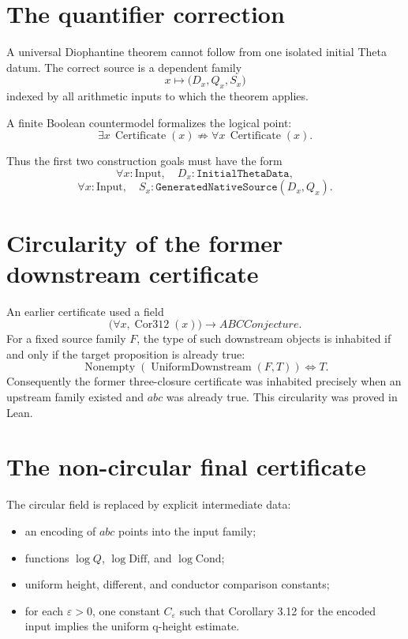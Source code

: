 \documentclass[11pt]{amsart}
\theoremstyle{definition}
\theoremstyle{remark}
\newcommand{\eps}{\varepsilon}
\begin{document}
\section{The quantifier correction}

A universal Diophantine theorem cannot follow from one isolated initial
Theta datum.  The correct source is a dependent family
\[
 x\longmapsto
 \bigl(D_x,Q_x,S_x\bigr)
\]
indexed by all arithmetic inputs to which the theorem applies.

A finite Boolean countermodel formalizes the logical point:
\[
 \exists x\,\operatorname{Certificate}(x)
 \not\Rightarrow
 \forall x\,\operatorname{Certificate}(x).
\]

Thus the first two construction goals must have the form
\[
 \forall x:\mathrm{Input},\quad
 D_x:\texttt{InitialThetaData},
\]
\[
 \forall x:\mathrm{Input},\quad
 S_x:\texttt{GeneratedNativeSource}(D_x,Q_x).
\]

\section{Circularity of the former downstream certificate}

An earlier certificate used a field
\[
 \bigl(\forall x,\operatorname{Cor312}(x)\bigr)
 \longrightarrow ABCConjecture.
\]
For a fixed source family $F$, the type of such downstream objects is
inhabited if and only if the target proposition is already true:
\[
 \boxed{
 \operatorname{Nonempty}
 (\operatorname{UniformDownstream}(F,T))
 \iff T.
 }
\]
Consequently the former three-closure certificate was inhabited precisely
when an upstream family existed and $abc$ was already true.  This circularity
was proved in Lean.

\section{The non-circular final certificate}

The circular field is replaced by explicit intermediate data:

\begin{itemize}
\item an encoding of $abc$ points into the input family;
\item functions $\log Q$, $\log\mathrm{Diff}$, and $\log\mathrm{Cond}$;
\item uniform height, different, and conductor comparison constants;
\item for each $\eps>0$, one constant $C_\eps$ such that Corollary 3.12 for
the encoded input implies the uniform q-height estimate.
\end{itemize}
\end{document}
